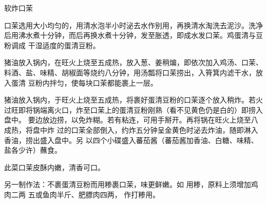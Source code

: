 \begin{recipe}{软炸口茉}

\ingredients


\preparation

\step 口茉选用大小均匀的，用清水泡半小时泌去水作别用，再换清水淘洗去泥沙。洗净
后用沸水煮十分钟，而后再换水煮十分钟，发至胀透，即成水发口茉。鸡蛋清与豆粉调成
干湿适度的蛋清豆粉。

\step 猪油放入锅内，在旺火上烧至五成热，放入葱、姜稍煸，即依次加入鸡汤、口茉、
料酒、盐、味精、胡椒面等烧约八分钟，用汤瓢将口茉捞出，入筲箕内滤干水，放入蛋清
豆粉内拌匀，使每块口茉都能裹上一层。

\step 猪油放入锅内，于旺火上烧至五成热，将裹好蛋清豆粉的口茉逐个放入稍炸。若火
过旺即将锅端离火口，炸至口茉上的蛋清豆粉刚熟（看不见黄色仍是白的）即捞入盘中。
要边放边捞，以免炸糊。若有粘连，可用手掰开。再将锅在旺火上烧至八成热，将盘中炸
过的口茉全部倒入，约炸五分钟呈金黄色时泌去炸油，随即淋入香油，捞出盛入盘中。另
以四个小碟盛入蕃茄酱（蕃茄酱加香油、白糖、味精、盐各少许）蘸食。

\features

此菜口茉皮酥内嫩，清香可口。

另一制作法：不裹蛋清豆粉而用糁裹口茉，味更鲜嫩。如 用糁，原料上须增加鸡肉二两
五或鱼肉半斤、肥膘肉四两， 作打糁用。

\end{recipe}

